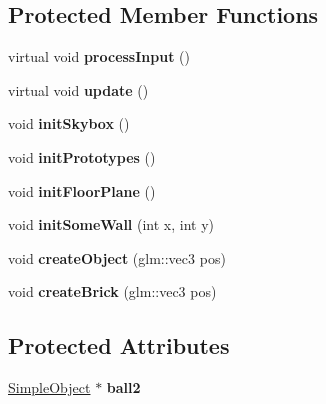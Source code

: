 \subsection*{Protected Member Functions}
\begin{DoxyCompactItemize}
\item 
\mbox{\label{class_example_game_a7944aa343acdc2373bf3c4704dff2893}} 
virtual void {\bfseries process\+Input} ()
\item 
\mbox{\label{class_example_game_a16aa2ede5884f61d85b2afe07066a0e3}} 
virtual void {\bfseries update} ()
\item 
\mbox{\label{class_example_game_a9e44c5d059433d2726b9316ae3ba884c}} 
void {\bfseries init\+Skybox} ()
\item 
\mbox{\label{class_example_game_a5ca873fd98a90b3c25c0699977e2faa0}} 
void {\bfseries init\+Prototypes} ()
\item 
\mbox{\label{class_example_game_adbc03f8b534894675bc05ca90f7c59b0}} 
void {\bfseries init\+Floor\+Plane} ()
\item 
\mbox{\label{class_example_game_ab772e1914b60ff53a5b20c6dd1fb2894}} 
void {\bfseries init\+Some\+Wall} (int x, int y)
\item 
\mbox{\label{class_example_game_a1d799ceadbd869a3c5e50512e02e3104}} 
void {\bfseries create\+Object} (glm\+::vec3 pos)
\item 
\mbox{\label{class_example_game_a0a2bd4a82db3e4ec5af7498423e86bae}} 
void {\bfseries create\+Brick} (glm\+::vec3 pos)
\end{DoxyCompactItemize}
\subsection*{Protected Attributes}
\begin{DoxyCompactItemize}
\item 
\mbox{\label{class_example_game_acb52f0540c7ebc801d21f8c7f77d7487}} 
\hyperlink{class_simple_object}{Simple\+Object} $\ast$ {\bfseries ball2}
\end{DoxyCompactItemize}
